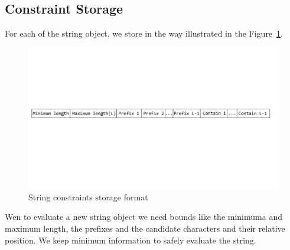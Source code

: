 \subsection{Constraint Storage}
\label{subsec:constraintStorage}

For each of the string object, we store in the way illustrated in the
Figure~\ref{fig:constraint}.

\begin{figure}[htb]
\centering
\includegraphics[width=6.5in]{images/constraint.pdf}
\caption{String constraints storage format}
\label{fig:constraint}
\end{figure}

Wen to evaluate a new string object we need bounds like the minimuma and maximum
length, the prefixes and the candidate characters and their relative position.
We keep minimum information to safely evaluate the string.
